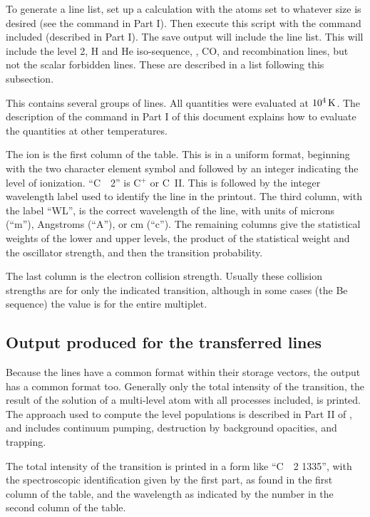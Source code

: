 To generate a line list, set up a calculation with the atoms set to
whatever size is desired (see the  command in Part I).  Then execute
this script with the  command included (described in Part I).
The save output will include the line list.
This will include the level 2, H and He iso-sequence,
\htwo, CO, and recombination lines,
but not the scalar forbidden lines.
These are described in a list following this subsection.

This contains several groups of lines.
All quantities were evaluated at $10^4 {\rm\thinspace K}$.
The description of the command in Part I of this document explains
how to evaluate the quantities at other temperatures.

The ion is the first column of the table.
This is in a uniform format,
beginning with the two character element symbol and followed by an integer
indicating the level of ionization.
``C~~2'' is C$^+$ or C~II.
This is
followed by the integer wavelength label used to identify the line in the
printout.
The third column, with the label ``WL'', is the correct wavelength
of the line, with units of microns (``m''), Angstroms (``A''),
or cm (``c'').
The remaining columns give the statistical weights of the lower and upper
levels, the product of the statistical weight and the oscillator strength,
and then the transition probability.

The last column is the electron collision strength.
Usually these collision strengths
are for only the indicated transition, although in some cases (the Be
sequence) the value is for the entire multiplet.

\subsection{Output produced for the transferred lines}

Because the lines have a common format within their storage vectors,
the output has a common format too.
Generally only the total intensity
of the transition, the result of the solution of a multi-level atom with
all processes included, is printed.
The approach used to compute the level
populations is described in Part II of \Hazy,
and includes continuum pumping,
destruction by background opacities, and trapping.

The total intensity of the transition is printed in a form like ``C~~2 1335'', with the spectroscopic identification given by the first part,
as found in the first column of the table, and the wavelength as indicated
by the number in the second column of the table.

